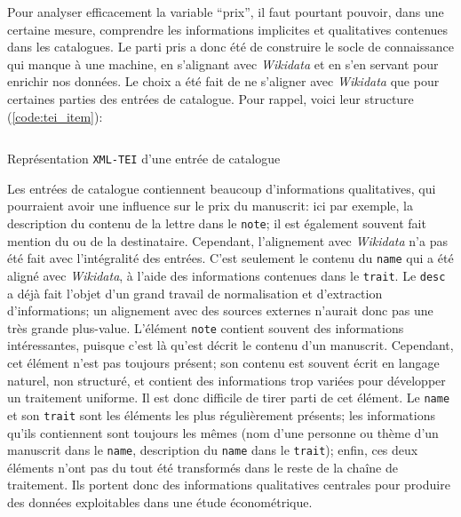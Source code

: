 \documentclass[a4paper, 12pt, twoside]{book}
\newenvironment{code}{\captionsetup{type=listing}}{}
\newcommand{\tname}{\texttt{name}}
\newcommand{\ttrait}{\texttt{trait}}
\newcommand{\tdesc}{\texttt{desc}}
\newcommand{\tnote}{\texttt{note}}
\newcommand{\xmltei}{\texttt{XML-TEI}}
\newcommand{\wkd}{\textit{Wikidata}}
\begin{document}
Pour analyser efficacement la variable \enquote{prix}, il faut pourtant pouvoir, dans une certaine mesure, comprendre les informations implicites et qualitatives contenues dans les catalogues. Le parti pris a donc été de construire le socle de connaissance qui manque à une machine, en s'alignant avec \wkd{} et en s'en servant pour enrichir nos données. Le choix a été fait de ne s'aligner avec \wkd{} que pour certaines parties des entrées de catalogue. Pour rappel, voici leur structure (\ref{code:tei_item}):

\begin{code}
	\inputminted[linenos, breaklines, tabsize=4]{xml}{code/tei_item.xml}
	\caption{Représentation \xmltei{} d'une entrée de catalogue}
	\label{code:tei_item}
\end{code}


Les entrées de catalogue contiennent beaucoup d'informations qualitatives, qui pourraient avoir une influence sur le prix du manuscrit: ici par exemple, la description du contenu de la lettre dans le \tnote{}; il est également souvent fait mention du ou de la destinataire. Cependant, l'alignement avec \wkd{} n'a pas été fait avec l'intégralité des entrées. C'est seulement le contenu du \tname{} qui a été aligné avec \wkd{}, à l'aide des informations contenues dans le \ttrait{}. Le \tdesc{} a déjà fait l'objet d'un grand travail de normalisation et d'extraction d'informations; un alignement avec des sources externes n'aurait donc pas une très grande plus-value. L'élément \tnote{} contient souvent des informations intéressantes, puisque c'est là qu'est décrit le contenu d'un manuscrit. Cependant, cet élément n'est pas toujours présent; son contenu est souvent écrit en langage naturel, non structuré, et contient des informations trop variées pour développer un traitement uniforme. Il est donc difficile de tirer parti de cet élément. Le \tname{} et son \ttrait{} sont les éléments les plus régulièrement présents; les informations qu'ils contiennent sont toujours les mêmes (nom d'une personne ou thème d'un manuscrit dans le \tname{}, description du \tname{} dans le \ttrait{}); enfin, ces deux éléments n'ont pas du tout été transformés dans le reste de la chaîne de traitement. Ils portent donc des informations qualitatives centrales pour produire des données exploitables dans une étude économétrique.
\end{document}

